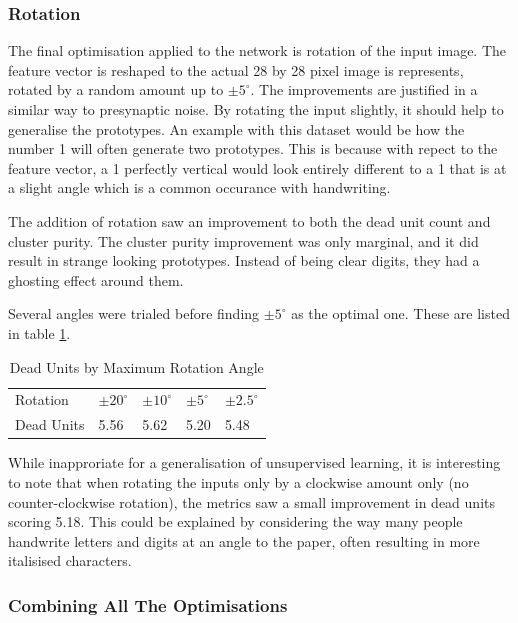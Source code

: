 \documentclass[11pt,journal,transmag,final]{IEEEtran}
\begin{document}
\subsubsection{Rotation}

The final optimisation applied to the network is rotation of the input image. The feature vector is reshaped to the actual 28 by 28 pixel image is represents, rotated by a random amount up to $\pm5^{\circ}$. The improvements are justified in a similar way to presynaptic noise. By rotating the input slightly, it should help to generalise the prototypes. An example with this dataset would be how the number 1 will often generate two prototypes. This is because with repect to the feature vector, a 1 perfectly vertical would look entirely different to a 1 that is at a slight angle which is a common occurance with handwriting.

The addition of rotation saw an improvement to both the dead unit count and cluster purity. The cluster purity improvement was only marginal, and it did result in strange looking prototypes. Instead of being clear digits, they had a ghosting effect around them.

Several angles were trialed before finding $\pm5^\circ$ as the optimal one. These are listed in table \ref{table:nn-rotations}.

\begin{table}[h]
    \centering
    \caption{Dead Units by Maximum Rotation Angle}
    \label{table:nn-rotations}
    \begin{tabular}{l|llll}
                    Rotation & $\pm20^\circ$ & $\pm10^\circ$ & $\pm5^\circ$ & $\pm2.5^\circ$ \\
                    Dead Units & 5.56 & 5.62 & 5.20 & 5.48
    \end{tabular}
\end{table}

While inapproriate for a generalisation of unsupervised learning, it is interesting to note that when rotating the inputs only by a clockwise amount only (no counter-clockwise rotation), the metrics saw a small improvement in dead units scoring 5.18. This could be explained by considering the way many people handwrite letters and digits at an angle to the paper, often resulting in more italisised characters.

\subsubsection{Combining All The Optimisations}
\end{document}
